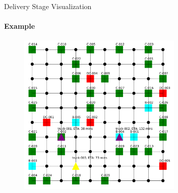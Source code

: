 \documentclass{beamer}
\begin{document}
\begin{frame}{Delivery Stage Visualization}
\framesubtitle{Example}
\begin{figure}[h!]
	\centering
	\includegraphics[width=0.7\textwidth]{Visualization.png}
\end{figure}
\end{frame}
\end{document}
